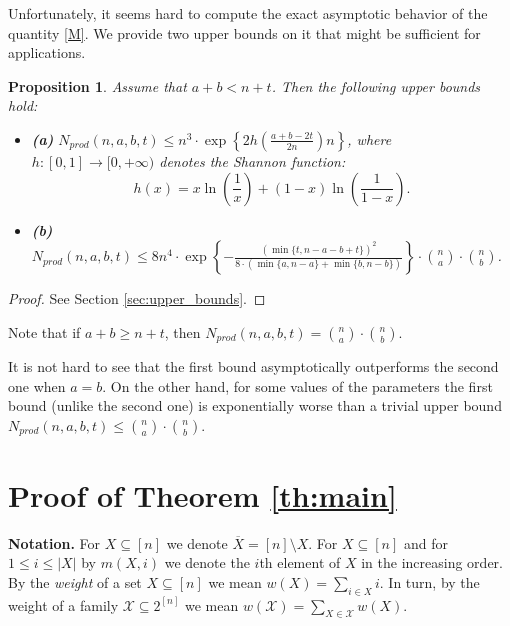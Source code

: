 \documentclass[12pt]{article}
\let\leq\leqslant
\let\geq\geqslant
\let\le\leq
\let\ge\geq
\def\X{{\mathcal X}}
\def\X{\ensuremath{{\mathcal X}}}
\newtheorem{proposition}[theorem]{Proposition}
\begin{document}
Unfortunately, it seems hard to compute the exact asymptotic behavior of 
the quantity \eqref{M}. We provide two upper bounds on it that might be sufficient for applications.

\begin{proposition}
\label{upper_bounds}
Assume that $a + b < n + t$. Then the following upper bounds hold:
\begin{itemize}
\item \textbf{(a)} 
$N_{prod}(n,a, b, t) \le n^3 \cdot \exp\left\{2h\left(\frac{a + b - 2t}{2n}\right)n\right\}$, where $h\colon [0, 1]\to[0,+\infty)$ denotes the Shannon function:
$$h(x) = x\ln\left(\frac{1}{x}\right) + (1 - x) \ln\left(\frac{1}{1 - x}\right).$$
\item \textbf{(b)}
$N_{prod}(n,a, b, t)\le 8n^4 \cdot \exp\left\{-\frac{(\min\{t, n - a - b + t\})^2}{8 \cdot (\min\{a, n - a\} + \min\{b, n - b\})}\right\} \cdot \binom{n}{a}\cdot\binom{n}{b}$.
\end{itemize}
\end{proposition}
\begin{proof}
See Section \ref{sec:upper_bounds}.
\end{proof}

Note that if $a + b \ge n + t$, then $N_{prod}(n, a, b, t) = \binom{n}{a}\cdot \binom{n}{b}$.

It is not hard to see that the first bound asymptotically outperforms the second one when $a = b$. On the other hand, for some values of the parameters the first bound (unlike the second one) is exponentially worse than a trivial upper bound  $N_{prod}(n,a,b,t) \le \binom{n}{a}\cdot\binom{n}{b}$.


\section{Proof of Theorem \ref{th:main}}
\label{sec:th:main}

\textbf{Notation.} For $X\subseteq[n]$ we denote $\overline{X} = [n]\setminus X$. For $X\subseteq [n]$ and for $1 \le i\le |X| $ by $m(X, i)$ we denote the $i$th element of $X$ in the increasing order. By the \emph{weight} of a set $X\subseteq [n]$ we mean $w(X) = \sum_{i\in X} i$. In turn, by the weight of a family $\X \subseteq 2^{[n]}$ we mean $w(\X) = \sum_{X\in \X} w(X)$.


\bigskip
\end{document}
